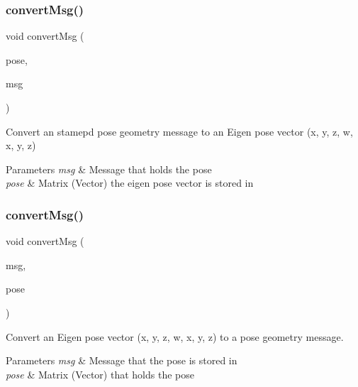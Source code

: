\subsubsection{\texorpdfstring{convert\+Msg()}{convertMsg()}\hspace{0.1cm}{\footnotesize\ttfamily [7/14]}}
{\footnotesize\ttfamily void convert\+Msg (\begin{DoxyParamCaption}\item[{Eigen\+::\+Matrix$<$ double, 7, 1 $>$ \&}]{pose,  }\item[{geometry\+\_\+msgs\+::\+Pose\+Stamped \&}]{msg }\end{DoxyParamCaption})\hspace{0.3cm}{\ttfamily [inline]}}



Convert an stamepd pose geometry message to an Eigen pose vector (x, y, z, w, x, y, z) 


\begin{DoxyParams}{Parameters}
{\em msg} & Message that holds the pose \\
\hline
{\em pose} & Matrix (Vector) the eigen pose vector is stored in \\
\hline
\end{DoxyParams}
\mbox{\label{group__MultiRobotController_ga7beb50c98e49263d05b3b819be58d76c}} 
\subsubsection{\texorpdfstring{convert\+Msg()}{convertMsg()}\hspace{0.1cm}{\footnotesize\ttfamily [8/14]}}
{\footnotesize\ttfamily void convert\+Msg (\begin{DoxyParamCaption}\item[{geometry\+\_\+msgs\+::\+Pose \&}]{msg,  }\item[{Eigen\+::\+Matrix$<$ double, 7, 1 $>$ \&}]{pose }\end{DoxyParamCaption})\hspace{0.3cm}{\ttfamily [inline]}}



Convert an Eigen pose vector (x, y, z, w, x, y, z) to a pose geometry message. 


\begin{DoxyParams}{Parameters}
{\em msg} & Message that the pose is stored in \\
\hline
{\em pose} & Matrix (Vector) that holds the pose \\
\hline
\end{DoxyParams}
\mbox{\label{group__MultiRobotController_gaf1628de186f2d90b064f8c8b36beef53}} 
